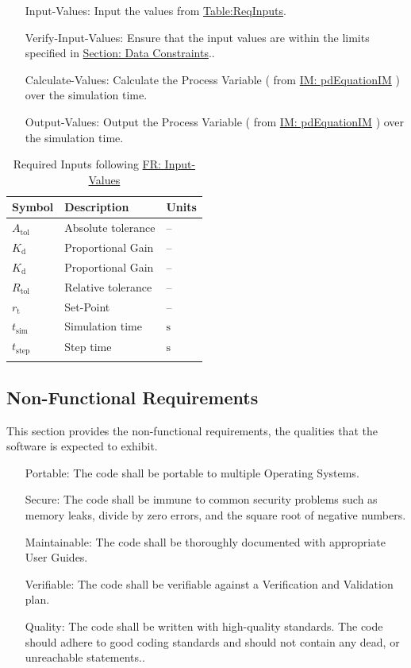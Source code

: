 \documentclass[12pt]{article}
\begin{document}
\begin{itemize}
\item[Input-Values:\phantomsection\label{inputValues}]{Input the values from \hyperref[Table:ReqInputs]{Table:ReqInputs}.}
\item[Verify-Input-Values:\phantomsection\label{verifyInputs}]{Ensure that the input values are within the limits specified in \hyperref[Sec:DataConstraints]{Section: Data Constraints}..}
\item[Calculate-Values:\phantomsection\label{calculateValues}]{Calculate the Process Variable ( from \hyperref[IM:pdEquationIM]{IM: pdEquationIM}  ) over  the simulation time.}
\item[Output-Values:\phantomsection\label{outputValues}]{Output the Process Variable ( from \hyperref[IM:pdEquationIM]{IM: pdEquationIM}  ) over  the simulation time.}
\end{itemize}
\begin{longtable}{l l l}
\toprule
\textbf{Symbol} & \textbf{Description} & \textbf{Units}
\\
\midrule
\endhead
${A_{\text{tol}}}$ & Absolute tolerance & --
\\
${K_{\text{d}}}$ & Proportional Gain & --
\\
${K_{\text{d}}}$ & Proportional Gain & --
\\
${R_{\text{tol}}}$ & Relative tolerance & --
\\
${r_{\text{t}}}$ & Set-Point & --
\\
${t_{\text{sim}}}$ & Simulation time & ${\text{s}}$
\\
${t_{\text{step}}}$ & Step time & ${\text{s}}$
\\
\bottomrule
\caption{Required Inputs following \hyperref[inputValues]{FR: Input-Values}}
\label{Table:ReqInputs}
\end{longtable}
\subsection{Non-Functional Requirements}
\label{Sec:NFRs}
This section provides the non-functional requirements, the qualities that the software is expected to exhibit.

\begin{itemize}
\item[Portable:\phantomsection\label{portability}]{The code shall be portable to multiple Operating Systems.}
\item[Secure:\phantomsection\label{security}]{The code shall be immune to common security problems such as memory leaks, divide by zero errors, and the square root of negative numbers.}
\item[Maintainable:\phantomsection\label{maintainability}]{The code shall be thoroughly documented with appropriate User Guides.}
\item[Verifiable:\phantomsection\label{verifiability}]{The code shall be verifiable against a Verification and Validation plan.}
\item[Quality:\phantomsection\label{quality}]{The code shall be written with high-quality standards. The code should adhere to good coding standards and should not contain any dead, or unreachable statements..}
\end{itemize}
\end{document}
